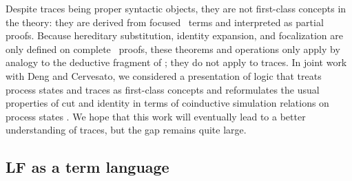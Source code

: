 Despite traces being proper syntactic objects, they are not
first-class concepts in the theory: they are derived from focused
\ollll~terms and interpreted as partial proofs. Because hereditary
substitution, identity expansion, and focalization are only defined on
complete \ollll~proofs, these theorems and operations only apply by
analogy to the deductive fragment of \sls; they do not apply to
traces.  In joint work with Deng and Cervesato, we considered a
presentation of logic that treats process states and traces as
first-class concepts and reformulates the usual properties of cut and
identity in terms of coinductive simulation relations on process
states \cite{deng12relating}. We hope that this work will eventually
lead to a better understanding of traces, but the gap remains quite
large.






\subsection{LF as a term language}
\label{sec:why-not-fully-dependent}

